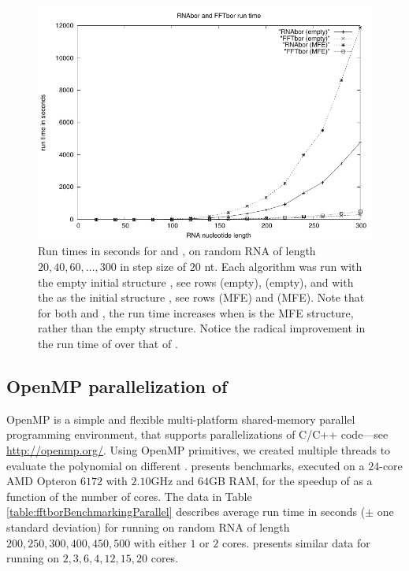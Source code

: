 \begin{figure}[!ht]
\centering
\includegraphics[width=.9\textwidth]{Figures/FFTbor/rnaborfftborRunTimeEvan.pdf}
\caption[Run times in seconds for \rnabor and \fftbor, on random RNA
of length $20$--$300$ in step size of $20$ nt]{Run times in seconds for \rnabor and \fftbor, on random RNA
of length $20,40,60,\dots,300$ in step size of $20$ nt. Each algorithm
was run with the empty initial structure \strSt, see rows
\rnabor (empty), \fftbor (empty), and with the \mfes as the initial structure
\strSt, see rows
\rnabor (MFE) and \fftbor (MFE). Note that for both \rnabor
and \fftbor, the run time increases when \strSt is the MFE structure,
rather than the empty structure. Notice the radical improvement in the
run time of \fftbor over that of \rnabor.
}
\label{fig:fftbor:benchmarking}
\end{figure}

\subsection{OpenMP parallelization of \fftbor}
\label{subsec:fftbor:openmp}

OpenMP is a simple and flexible
multi-platform shared-memory parallel programming environment, that supports
parallelizations of C/C++ code---see \url{http://openmp.org/}.
Using OpenMP primitives, we created multiple threads to evaluate the polynomial
\fullZx on different \nRoUs. 
presents benchmarks, executed on
a $24$-core AMD Opteron $6172$ with $2.10$GHz and $64$GB RAM, for the speedup
of \fftbor as a function of the number of cores.
The data in Table \ref{table:fftborBenchmarkingParallel} describes average
run time in seconds ($\pm$ one standard deviation) for running \fftbor
on random RNA of length $200,250,300,400,450,500$ with either $1$ or $2$ cores.
presents similar data for running
\fftbor on $2,3,6,4,12,15,20$ cores.

